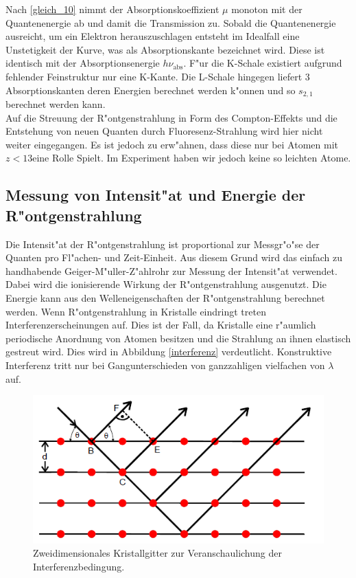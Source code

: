 		Nach \eqref{gleich_10} nimmt der Absorptionskoeffizient $\mu$ monoton mit der Quantenenergie ab und damit die Transmission zu.
		Sobald die Quantenenergie ausreicht, um ein Elektron he\-raus\-zu\-schla\-gen entsteht im Idealfall eine Unstetigkeit der Kurve, was als Absorptionskante bezeichnet wird.
		Diese ist identisch mit der Ab\-sorp\-tions\-e\-nergie $h\nu_\mathrm{abs}$.
		F"ur die K-Schale existiert aufgrund fehlender Feinstruktur nur eine K-Kante.
		Die L-Schale hingegen liefert 3 Ab\-sorp\-tions\-kan\-ten deren Energien berechnet werden k"onnen und so $s_{2,1}$ berechnet werden kann.\\
		Auf die Streuung der R"ontgenstrahlung in Form des Compton-Effekts und die Entstehung von neuen Quanten durch Fluoresenz-Strahlung wird hier nicht weiter eingegangen. Es ist jedoch zu erw"ahnen, dass diese nur bei Atomen mit $z < 13$eine Rolle Spielt.
		Im Experiment haben wir jedoch keine so leichten Atome.

	\subsection{Messung von Intensit"at und Energie der R"ontgenstrahlung} 
	\label{sub:messung_von_intensit_at_}
	
	Die Intensit"at der R"ontgenstrahlung ist proportional zur Messgr"o"se der Quanten pro Fl"achen- und Zeit-Einheit.
	Aus diesem Grund wird das einfach zu handhabende Geiger-M"uller-Z"ahlrohr zur Messung der Intensit"at verwendet. Dabei wird die ionisierende Wirkung der R"ontgenstrahlung ausgenutzt.
	Die Energie kann aus den Welleneigenschaften der R"ontgenstrahlung berechnet werden.
	Wenn R"ontgenstrahlung in Kristalle eindringt treten In\-ter\-fe\-renz\-er\-schei\-nung\-en auf.
	Dies ist der Fall, da Kristalle eine r"aumlich periodische Anordnung von Atomen besitzen und die Strahlung an ihnen elastisch gestreut wird. Dies wird in Abbildung \eqref{interferenz} verdeutlicht. 
	Konstruktive Interferenz tritt nur bei Gangunterschieden von ganzzahligen vielfachen von $\lambda$ auf.

	\begin{figure}[htbp]
		\centering
		\includegraphics[width = 12cm]{img/interferenz.PNG}
		\caption{Zweidimensionales Kristallgitter zur Veranschaulichung der Interferenzbedingung. \cite{anleitung}}
		\label{interferenz}
	\end{figure}

